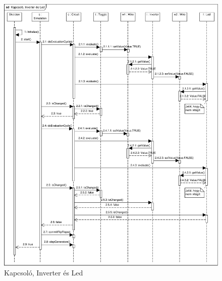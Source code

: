\begin{figure}[H]
\begin{center}
\includegraphics[width=17cm]{chapters/chapter05/imgs/test2.pdf}
\caption{Kapcsoló, Inverter és Led}
\label{fig:toggle_inv_led}
\end{center}
\end{figure}

